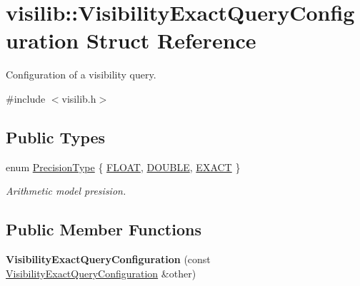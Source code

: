 \hypertarget{structvisilib_1_1_visibility_exact_query_configuration}{}\section{visilib\+::Visibility\+Exact\+Query\+Configuration Struct Reference}
\label{structvisilib_1_1_visibility_exact_query_configuration}


Configuration of a visibility query.  




{\ttfamily \#include $<$visilib.\+h$>$}

\subsection*{Public Types}
\begin{DoxyCompactItemize}
\item 
enum \mbox{\hyperlink{structvisilib_1_1_visibility_exact_query_configuration_a1cd44b0dffc3d51eb0bd5af35eeb9a8b}{Precision\+Type}} \{ \mbox{\hyperlink{structvisilib_1_1_visibility_exact_query_configuration_a1cd44b0dffc3d51eb0bd5af35eeb9a8ba804621a91ffab216263ead381509cbb9}{F\+L\+O\+AT}}, 
\mbox{\hyperlink{structvisilib_1_1_visibility_exact_query_configuration_a1cd44b0dffc3d51eb0bd5af35eeb9a8bae6d683564c0978e72ac4b6be27998aa5}{D\+O\+U\+B\+LE}}, 
\mbox{\hyperlink{structvisilib_1_1_visibility_exact_query_configuration_a1cd44b0dffc3d51eb0bd5af35eeb9a8bad3b9971ac7b554145ebb1ee55bdd97c7}{E\+X\+A\+CT}}
 \}
\begin{DoxyCompactList}\small\item\em Arithmetic model presision. \end{DoxyCompactList}\end{DoxyCompactItemize}
\subsection*{Public Member Functions}
\begin{DoxyCompactItemize}
\item 
\mbox{\label{structvisilib_1_1_visibility_exact_query_configuration_af680434fd7a78d6eab1c94e5ff1806ed}} 
{\bfseries Visibility\+Exact\+Query\+Configuration} (const \mbox{\hyperlink{structvisilib_1_1_visibility_exact_query_configuration}{Visibility\+Exact\+Query\+Configuration}} \&other)
\end{DoxyCompactItemize}
